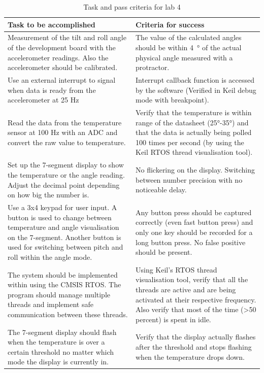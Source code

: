 \documentclass[12pt]{article}
\begin{document}
\begin{table}[!h]
\centering
\caption{Task and pass criteria for lab 4}
\label{Table_tasks}
\begin{tabular}{|p{0.5\linewidth}|p{0.5\linewidth}|}
\hline
\textbf{Task to be accomplished} & \textbf{Criteria for success} \\ \hline
Measurement of the tilt and roll angle of the development board with the accelerometer readings. Also the accelerometer should be calibrated. & The value of the calculated angles should be within \SI{4}{\degree} of the actual physical angle measured with a protractor. \\ \hline
Use an external interrupt to signal when data is ready from the accelerometer at 25 Hz & Interrupt callback function is accessed by the software (Verified in Keil debug mode with breakpoint). \\ \hline
Read the data from the temperature sensor at 100 Hz with an ADC and convert the raw value to temperature. & Verify that the temperature is within range of the datasheet (25°-35°) and that the data is actually being polled 100 times per second (by using the Keil RTOS thread visualisation tool). \\ \hline
Set up the 7-segment display to show the temperature or the angle reading. Adjust the decimal point depending on how big the number is. & No flickering on the display. Switching between number precision with no noticeable delay. \\ \hline
Use a 3x4 keypad for user input. A button is used to change between temperature and angle visualisation on the 7-segment. Another button is used for switching between pitch and roll within the angle mode. & Any button press should be captured correctly (even fast button press) and only one key should be recorded for a long button press. No false positive should be present. \\ \hline
The system should be implemented within using the CMSIS RTOS. The program should manage multiple threads and implement safe communication between these threads. & Using Keil's RTOS thread visualisation tool, verify that all the threads are active and are being activated at their respective frequency. Also verify that most of the time (\textgreater 50 percent) is spent in idle. \\ \hline
The 7-segment display should flash when the temperature is over a certain threshold no matter which mode the display is currently in. & Verify that the display actually flashes after the threshold and stops flashing when the temperature drops down. \\ \hline
\end{tabular}
\end{table}
\end{document}
